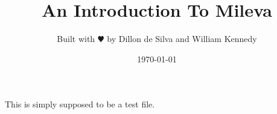 \documentclass{article}
\title{An Introduction To Mileva}
\author{Built with $\varheartsuit$ by Dillon de Silva and William Kennedy}
\date{\today}
\begin{document}
\maketitle

This is simply supposed to be a test file.
\end{document}
